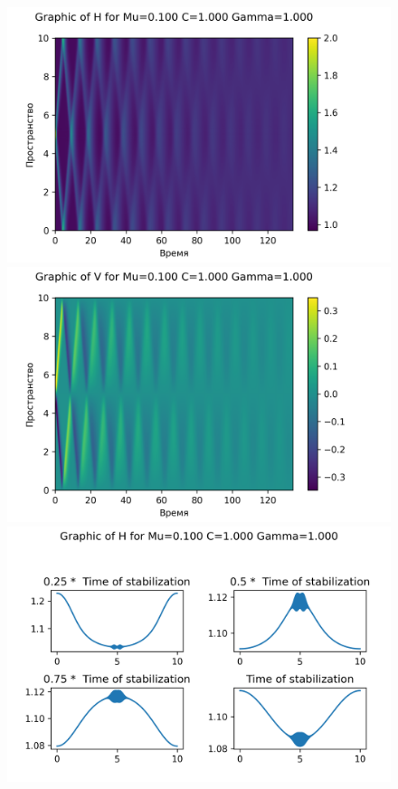 \begin{figure}[H]
	\centering
	\includegraphics[scale=0.5]{../graphs_data_nonsmooth_1/value/Graph_H_mu0.100_C1.000_gamma1.000.png}
	\includegraphics[scale=0.5]{../graphs_data_nonsmooth_1/value/Graph_V_mu0.100_C1.000_gamma1.000.png}	
	\includegraphics[scale=0.5]{../graphs_data_nonsmooth_1/slices/Graph_H_mu0.100_C1.000_gamma1.000.png}

\end{figure}
